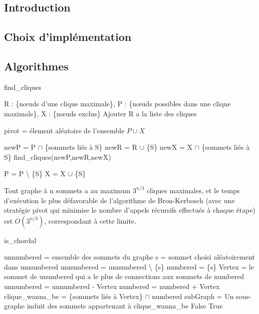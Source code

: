 \documentclass{article}
\begin{document}
	
	\subsection{Introduction}
	
	\subsection{Choix d'implémentation}
	
	\subsection{Algorithmes}
	
		\begin{algorithm}[H]
		\caption{find\_cliques}
		\begin{algorithmic}[1]
		\REQUIRE R : \{nœuds d'une clique maximale\}, P : \{nœuds possibles dans une clique maximale\}, X : \{nœuds exclus\}
		\STATE Ajouter R a la liste des cliques
		\ENDIF
		
		\ELSE
		
		\STATE pivot = élement aléatoire de l'ensemble $P \cup X $
		
		
		\STATE newP = P $\cap$ \{sommets liés à S\}
		\STATE newR = R $\cup$ \{S\}
		\STATE newX = X $\cap$ \{sommets liés à S\}
		\STATE find\_cliques(newP,newR,newX)
		
		\STATE P = P $\setminus$ \{S\}
		\STATE X = X $\cup$ \{S\}
		\ENDFOR		
		
		\ENDIF
	
	
		\end{algorithmic}
		\end{algorithm}

\cite{Algo1} Tout graphe à n sommets a au maximum $3^{n/3}$ cliques maximales, et le temps d'exécution le plus défavorable de l'algorithme de Bron-Kerbosch (avec une stratégie pivot qui minimise le nombre d'appels récursifs effectués à chaque étape) est $O(3^{n/3})$, correspondant à cette limite.


		\begin{algorithm}[H]
		\caption{is\_chordal}
		\begin{algorithmic}[1]		
		
		\STATE unnumbered = ensemble des sommets du graphe
		\STATE s = sommet choisi aléatoirement dans unnumbered
		\STATE unnumbered = unnumbered $\setminus$ \{s\}
		\STATE numbered  = \{s\}
			\STATE Vertex = le sommet de unumbered qui a le plus de connections aux sommets de numbered
			\STATE unnumbered = unnumbered - Vertex
			\STATE numbered = numbered + Vertex
			\STATE clique\_wanna\_be = \{sommets liés à Vertex\} $\cap$ numbered
			\STATE subGraph	= Un sous-graphe induit des sommets appartenant à clique\_wanna\_be
				\RETURN False
			\ENDIF
		\ENDWHILE
		\RETURN True
		\end{algorithmic}
		\end{algorithm}
\end{document}
